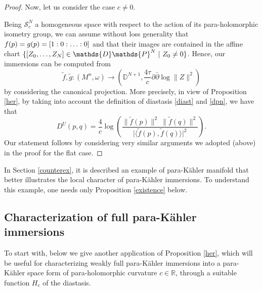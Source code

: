 \documentclass{article}
\newcommand{\R}{\mathds{R}}
\newcommand{\de}{\partial}
\newcommand{\s}{\mathcal{S}}
\newcommand{\pk}{para-K\"ahler }
\newcommand{\D}{\mathds{D}}
\newcommand{\DP}{\mathds{D}\mathds{P}}
\begin{document}
\begin{proof}
\noindent
Now, let us consider the case $c\neq 0$.

\noindent
Being $\s_c^N$ a homogeneous space with respect to the action of its para-holomorphic isometry group, we can assume without loss generality that $f(p)=g(p)=[1:0:\mathellipsis : 0]$ and that their images are contained in the affine chart   $\{[Z_0,\mathellipsis,Z_N]\in \DP^N \ |\ Z_0\neq 0\}$. Hence, our immersions can be computed from
$$\tilde f,\tilde g: (M^n,\omega)\to \left(\D^{N+1}, \frac{4\tau}{c}\de\bar\de\log \|Z\|^2 \right)$$ 
by considering the canonical projection.
More precisely, in view of Proposition \ref{her}, by taking into account the definition of diastasis \eqref{diast} and  \eqref{dpn}, we have that 
$$D^{U}(p,q) =\frac{4}{c}\log\left( \frac{\|\tilde f(p)\|^2 \ \|\tilde f(q)\|^2}{\big|\langle \tilde f(p),\tilde f(q) \rangle\big|^2}\right).$$
Our statement follows by considering very similar arguments we adopted (above) in the  proof for the flat case.
\end{proof}

In Section \ref{counterex}, it is described an example of \pk manifold that better illustrates the local character of \pk immersions. To understand this example, one needs only Proposition \ref{existence} below.





\subsection{Characterization of full \pk immersions}\label{pk immersion}

To start with, below we give another application  of Proposition \ref{her}, which will be useful for characterizing weakly full \pk immersions into a \pk space form of para-holomorphic curvature $c\in \R$, through a suitable function $H_c$ of the diastasis. 
\end{document}
